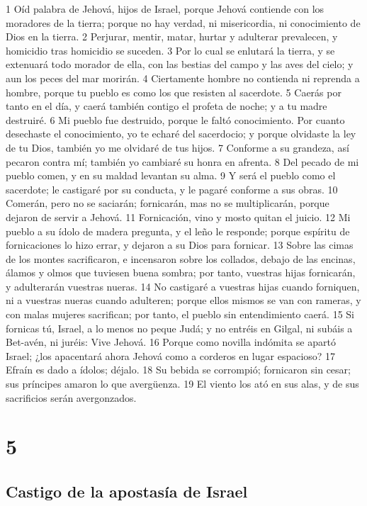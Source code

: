 1 Oíd palabra de Jehová, hijos de Israel, porque Jehová contiende con los moradores de la tierra; porque no hay verdad, ni misericordia, ni conocimiento de Dios en la tierra.
2 Perjurar, mentir, matar, hurtar y adulterar prevalecen, y homicidio tras homicidio se suceden.
3 Por lo cual se enlutará la tierra, y se extenuará todo morador de ella, con las bestias del campo y las aves del cielo; y aun los peces del mar morirán.
4 Ciertamente hombre no contienda ni reprenda a hombre, porque tu pueblo es como los que resisten al sacerdote.
5 Caerás por tanto en el día, y caerá también contigo el profeta de noche; y a tu madre destruiré.
6 Mi pueblo fue destruido, porque le faltó conocimiento. Por cuanto desechaste el conocimiento, yo te echaré del sacerdocio; y porque olvidaste la ley de tu Dios, también yo me olvidaré de tus hijos.
7 Conforme a su grandeza, así pecaron contra mí; también yo cambiaré su honra en afrenta.
8 Del pecado de mi pueblo comen, y en su maldad levantan su alma.
9 Y será el pueblo como el sacerdote; le castigaré por su conducta, y le pagaré conforme a sus obras.
10 Comerán, pero no se saciarán; fornicarán, mas no se multiplicarán, porque dejaron de servir a Jehová.
11 Fornicación, vino y mosto quitan el juicio.
12 Mi pueblo a su ídolo de madera pregunta, y el leño le responde; porque espíritu de fornicaciones lo hizo errar, y dejaron a su Dios para fornicar.
13 Sobre las cimas de los montes sacrificaron, e incensaron sobre los collados, debajo de las encinas, álamos y olmos que tuviesen buena sombra; por tanto, vuestras hijas fornicarán, y adulterarán vuestras nueras.
14 No castigaré a vuestras hijas cuando forniquen, ni a vuestras nueras cuando adulteren; porque ellos mismos se van con rameras, y con malas mujeres sacrifican; por tanto, el pueblo sin entendimiento caerá.
15 Si fornicas tú, Israel, a lo menos no peque Judá; y no entréis en Gilgal, ni subáis a Bet-avén, ni juréis: Vive Jehová.
16 Porque como novilla indómita se apartó Israel; ¿los apacentará ahora Jehová como a corderos en lugar espacioso?
17 Efraín es dado a ídolos; déjalo.
18 Su bebida se corrompió; fornicaron sin cesar; sus príncipes amaron lo que avergüenza.
19 El viento los ató en sus alas, y de sus sacrificios serán avergonzados.

\chapter{5}

\section*{Castigo de la apostasía de Israel}

